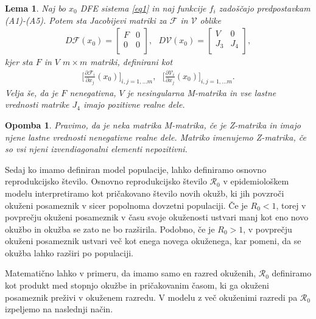 \documentclass[a4paper,12pt]{article}
\newcommand{\R}{\mathcal R}
\newcommand{\F}{\mathcal F}
\newcommand{\V}{\mathcal V}
\newtheorem{lema}{Lema}
\newtheorem{opomba}{Opomba}
\begin{document}
\begin{lema} \label{lema1}
    Naj bo \(x_0\) DFE sistema \ref{eq1} in naj funkcije \(f_i\) zadoščajo predpostavkam
    (A1)-(A5). Potem sta Jacobijevi matriki za \(\F\) in \(\V\) oblike
    \begin{align*}
        D\F(x_0)= 
        \begin{bmatrix}
        F & 0 \\
        0 & 0 \\
        \end{bmatrix},\textrm{ }
        D\V(x_0)=
        \begin{bmatrix}
        V & 0 \\
        J_3 & J_4 \\
        \end{bmatrix},
    \end{align*}
    kjer sta \(F\) in \(V\) \(m\times m\) matriki, definirani kot
    \begin{align*}
        \big[\frac{\partial \F_i}{\partial x_j}(x_0)\big]_{i,j=1,\ldots m},\textrm{ }
        \big[\frac{\partial \V_i}{\partial x_j}(x_0)\big]_{i,j=1,\ldots m}.
    \end{align*}
    Velja še, da je \(F\) nenegativna, \(V\) je nesingularna M-matrika in vse lastne
    vrednosti matrike \(J_4\) imajo pozitivne realne dele.
\end{lema}

\begin{opomba}
    Pravimo, da je neka matrika M-matrika, če je Z-matrika in imajo njene lastne
    vrednosti nenegativne realne dele. Matriko imenujemo Z-matrika, če so vsi njeni
    izvendiagonalni elementi nepozitivni.
\end{opomba}

Sedaj ko imamo definiran model populacije, lahko definiramo osnovno reprodukcijsko
število. Osnovno reprodukcijsko število \(\R_0\) v epidemiološkem modelu interpretiramo
kot pričakovano število novih okužb, ki jih povzroči okuženi posameznik v sicer popolnoma
dovzetni populaciji. Če je \(R_0<1\), torej v povprečju okuženi posameznik v času svoje
okuženosti ustvari manj kot eno novo okužbo in okužba se zato ne bo razširila. Podobno, če je 
\(R_0>1\), v povprečju okuženi posameznik ustvari več kot enega novega okuženega, kar pomeni,
da se okužba lahko razširi po populaciji. 

Matematično lahko v primeru, da imamo samo en razred okuženih, \(\R_0\) definiramo
kot produkt med stopnjo okužbe in pričakovanim časom, ki ga okuženi posameznik preživi 
v okuženem razredu. V modelu z več okuženimi razredi pa \(\R_0\) izpeljemo na naslednji način.
\end{document}
